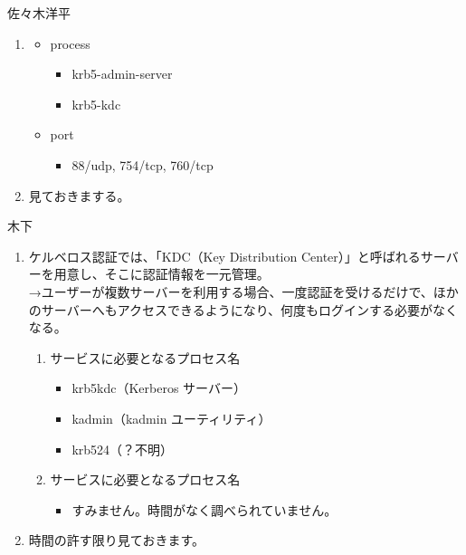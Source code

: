 \documentclass[mingoth,a4paper]{jsarticle}
\begin{document}
\begin{prework}{ 佐々木洋平 }
  \begin{enumerate}
  \item
    \begin{itemize}
    \item process
      \begin{itemize}
      \item krb5-admin-server
      \item krb5-kdc
      \end{itemize}
    \item port
      \begin{itemize}
      \item 88/udp, 754/tcp, 760/tcp
      \end{itemize}
    \end{itemize}
  \item 見ておきまする。
  \end{enumerate}
\end{prework}

\begin{prework}{ 木下 }
  \begin{enumerate}
  \item ケルベロス認証では、「KDC（Key Distribution Center）」と呼ばれるサーバーを用意し、そこに認証情報を一元管理。\\
    →ユーザーが複数サーバーを利用する場合、一度認証を受けるだけで、ほかのサーバーへもアクセスできるようになり、何度もログインする必要がなくなる。
    \begin{enumerate}
    \item サービスに必要となるプロセス名
      \begin{itemize}
      \item krb5kdc（Kerberos サーバー）
      \item kadmin（kadmin ユーティリティ）
      \item krb524（？不明）
      \end{itemize}
    \item サービスに必要となるプロセス名
      \begin{itemize}
      \item すみません。時間がなく調べられていません。
      \end{itemize}
    \end{enumerate}
  \item 時間の許す限り見ておきます。
  \end{enumerate}
\end{prework}
\end{document}

